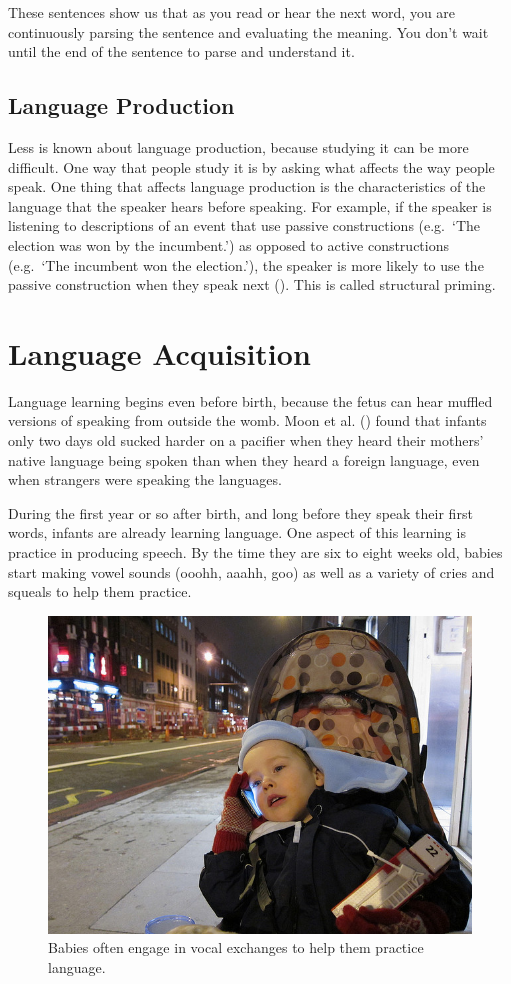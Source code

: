 \documentclass[
]{krantz}
\begin{document}
These sentences show us that as you read or hear the next word, you are continuously parsing the sentence and evaluating the meaning. You don't wait until the end of the sentence to parse and understand it.

\subsection*{Language Production}\label{language-production}


Less is known about language production, because studying it can be more difficult. One way that people study it is by asking what affects the way people speak. One thing that affects language production is the characteristics of the language that the speaker hears before speaking. For example, if the speaker is listening to descriptions of an event that use passive constructions (e.g.~`The election was won by the incumbent.') as opposed to active constructions (e.g.~`The incumbent won the election.'), the speaker is more likely to use the passive construction when they speak next (). This is called structural priming.

\section{Language Acquisition}\label{language-acquisition}

Language learning begins even before birth, because the fetus can hear muffled versions of speaking from outside the womb. Moon et al. () found that infants only two days old sucked harder on a pacifier when they heard their mothers' native language being spoken than when they heard a foreign language, even when strangers were speaking the languages.

During the first year or so after birth, and long before they speak their first words, infants are already learning language. One aspect of this learning is practice in producing speech. By the time they are six to eight weeks old, babies start making vowel sounds (ooohh, aaahh, goo) as well as a variety of cries and squeals to help them practice.

\begin{figure}

{\centering \includegraphics[width=0.4\linewidth]{images/ch8/fig2} 

}

\caption{Babies often engage in vocal exchanges to help them practice language.}\label{fig:practicing}
\end{figure}
\end{document}
